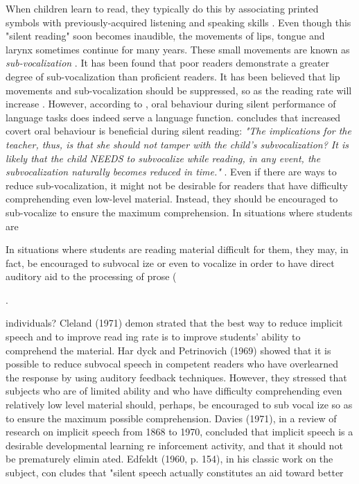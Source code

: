 When children learn to read, they typically do this by associating printed symbols with previously-acquired listening and speaking skills \cite{bruinsma_should_1980}. Even though this "silent reading" soon becomes inaudible, the movements of lips, tongue and larynx sometimes continue for many years. These small movements are known as \textit{sub-vocalization} \cite{bruinsma_should_1980}. It has been found that poor readers demonstrate a greater degree of sub-vocalization than proficient readers. It has been believed that lip movements and sub-vocalization should be suppressed, so as the reading rate will increase \cite{bruinsma_should_1980}. However, according to , oral behaviour during silent performance of language tasks does indeed serve a language function. \citeauthor{j_covert_1970} concludes that increased covert oral behaviour is beneficial during silent reading: \emph{"The implications for the teacher, thus, is that she should not tamper with the child's subvocalization? It is likely that the child NEEDS to subvocalize while reading, in any event, the subvocalization naturally becomes reduced in time."} \cite{bruinsma_should_1980}. Even if there are ways to reduce sub-vocalization, it might not be desirable for readers that have difficulty comprehending even low-level material. Instead, they should be encouraged to sub-vocalize to ensure the maximum comprehension. In situations where students are 

In
situations where students are reading
material difficult for them, they may,
in fact, be encouraged to subvocal
ize or even to vocalize in order to
have direct auditory aid to the
processing of prose (

\cite{bruinsma_should_1980}.



individuals? Cleland (1971) demon
strated that the best way to reduce
implicit speech and to improve read
ing rate is to improve students' ability
to comprehend the material. Har
dyck and Petrinovich (1969) showed
that it is possible to reduce subvocal
speech in competent readers who
have overlearned the response by
using auditory feedback techniques.
However, they stressed that subjects
who are of limited ability and who
have difficulty comprehending even
relatively low level material should,
perhaps, be encouraged to sub vocal
ize so as to ensure the maximum
possible comprehension. Davies
(1971), in a review of research on
implicit speech from 1868 to 1970,
concluded that implicit speech is a
desirable developmental learning re
inforcement activity, and that it
should not be prematurely elimin
ated. Edfeldt (1960, p. 154), in his
classic work on the subject, con
cludes that "silent speech actually
constitutes an aid toward better 

